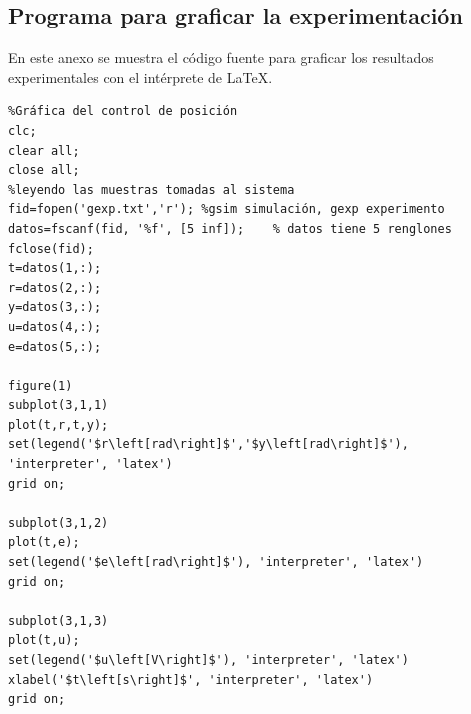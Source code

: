 \documentclass{article}
\begin{document}
\subsection{Programa para graficar la experimentación}
En este anexo se muestra el código fuente para graficar los resultados experimentales con el intérprete de LaTeX.
{\scriptsize
\begin{verbatim}
%Gráfica del control de posición
clc;
clear all;
close all;
%leyendo las muestras tomadas al sistema
fid=fopen('gexp.txt','r'); %gsim simulación, gexp experimento
datos=fscanf(fid, '%f', [5 inf]);    % datos tiene 5 renglones
fclose(fid);
t=datos(1,:); 
r=datos(2,:);
y=datos(3,:);
u=datos(4,:);
e=datos(5,:);

figure(1)
subplot(3,1,1)
plot(t,r,t,y);
set(legend('$r\left[rad\right]$','$y\left[rad\right]$'), 'interpreter', 'latex')
grid on;

subplot(3,1,2)
plot(t,e);
set(legend('$e\left[rad\right]$'), 'interpreter', 'latex')
grid on;

subplot(3,1,3)
plot(t,u);
set(legend('$u\left[V\right]$'), 'interpreter', 'latex')
xlabel('$t\left[s\right]$', 'interpreter', 'latex')
grid on;
\end{verbatim}
}
\end{document}
